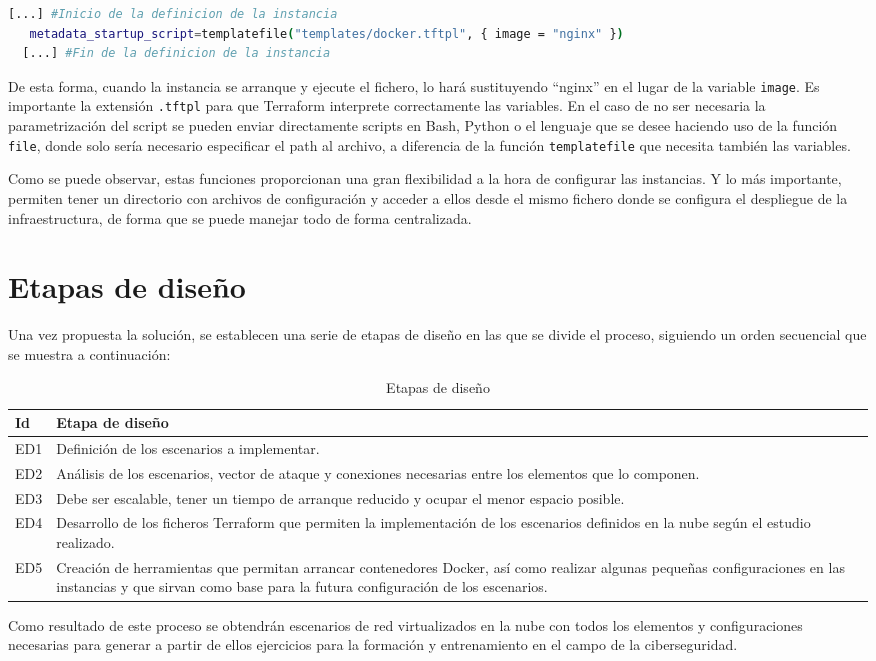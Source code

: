   \begin{lstlisting}[language=Bash, caption=Extracto de fichero de configuración .tf]
  [...] #Inicio de la definicion de la instancia
   metadata_startup_script=templatefile("templates/docker.tftpl", { image = "nginx" })
  [...] #Fin de la definicion de la instancia\end{lstlisting}

  De esta forma, cuando la instancia se arranque y ejecute el fichero, lo hará sustituyendo “nginx” en el lugar de la variable \texttt{image}. Es importante la extensión \texttt{.tftpl} para que Terraform interprete correctamente las variables. En el caso de no ser necesaria la parametrización del script se pueden enviar directamente scripts en Bash, Python o el lenguaje que se desee haciendo uso de la función \texttt{file}, donde solo sería necesario especificar el path al archivo, a diferencia de la función \texttt{templatefile} que necesita también las variables.

  Como se puede observar, estas funciones proporcionan una gran flexibilidad a la hora de configurar las instancias. Y lo más importante, permiten tener un directorio con archivos de configuración y acceder a ellos desde el mismo fichero donde se configura el despliegue de la infraestructura, de forma que se puede manejar todo de forma centralizada.

\section{Etapas de diseño} \label{sec:etp}
Una vez propuesta la solución, se establecen una serie de etapas de diseño en las que se divide el proceso, siguiendo un orden secuencial que se muestra a continuación:


  \begin{table}[h]
    \begin{center}
      \begin{tabular}{ | w{c}{1cm} | m{14cm} | }
        \hline{} \textbf{Id} & \textbf{Etapa de diseño} \\ \hline
        ED1 & Definición de los escenarios a implementar. \\ \hline{}
        ED2 & Análisis de los escenarios, vector de ataque y conexiones necesarias entre los elementos que lo componen. \\ \hline
        ED3 & Debe ser escalable, tener un tiempo de arranque reducido y ocupar el menor espacio posible. \\ \hline{}
        ED4 & Desarrollo de los ficheros Terraform que permiten la implementación de los escenarios definidos en la nube según el estudio realizado.  \\ \hline
        ED5 & Creación de herramientas que permitan arrancar contenedores Docker, así como realizar algunas pequeñas configuraciones en las instancias y que sirvan como base para la futura configuración de los escenarios. \\ \hline
      \end{tabular}
      \caption{Etapas de diseño}
      \label{tab:etps}
    \end{center}
  \end{table}

  Como resultado de este proceso se obtendrán escenarios de red virtualizados en la nube con todos los elementos y configuraciones necesarias para generar a partir de ellos ejercicios para la formación y entrenamiento en el campo de la ciberseguridad.
